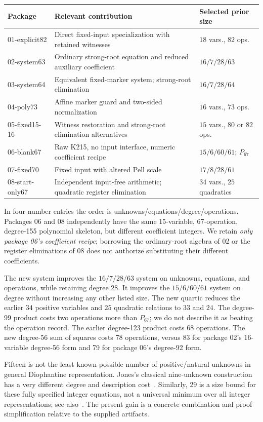 \documentclass[11pt,a4paper]{article}
\theoremstyle{remark}\newtheorem{remark}[theorem]{Remark}
\begin{document}
\begin{center}\small
\begin{tabular}{p{29mm}p{71mm}p{34mm}}
\toprule
Package & Relevant contribution & Selected prior size\\
\midrule
01-explicit82 & Direct fixed-input specialization with retained witnesses & $18$ vars., $82$ ops.\\
02-system63 & Ordinary strong-root equation and reduced auxiliary coefficient & $16/7/28/63$\\
03-system64 & Equivalent fixed-marker system; strong-root elimination & $16/7/28/64$\\
04-poly73 & Affine marker guard and two-sided normalization & $16$ vars., $73$ ops.\\
05-fixed15-16 & Witness restoration and strong-root elimination alternatives & $15$ vars., $80$ or $82$ ops.\\
06-blank67 & Raw K215, no input interface, numeric coefficient recipe & $15/6/60/61$; $P_{67}$\\
07-fixed70 & Fixed input with altered Pell scale & $17/8/28/61$\\
08-start-only67 & Independent input-free arithmetic; quadratic register elimination & $34$ vars., $25$ quadratics\\
\bottomrule
\end{tabular}
\end{center}
In four-number entries the order is unknowns/equations/degree/operations.
Packages 06 and 08 independently have the same 15-variable,
67-operation, degree-155 polynomial skeleton, but different coefficient
integers. We retain \emph{only package 06's coefficient recipe}; borrowing
the ordinary-root algebra of 02 or the register eliminations of 08 does
not authorize substituting their different coefficients.

The new system improves the $16/7/28/63$ system on unknowns, equations,
and operations, while retaining degree 28. It improves the $15/6/60/61$
system on degree without increasing any other listed size. The new
quartic reduces the earlier $34$ positive variables and $25$ quadratic
relations to $33$ and $24$. The degree-99 product costs two operations
more than $P_{67}$; we do not describe it as beating the operation record.
The earlier degree-123 product costs 68 operations. The new degree-56
sum of squares costs 78 operations, versus 83 for package 02's
16-variable degree-56 form and 79 for package 06's degree-92 form.

Fifteen is not the least known possible number of positive/natural
unknowns in general Diophantine representation. Jones's classical
nine-unknown construction has a very different degree and description
cost~\cite{jones}. Similarly, 29 is a size bound for these fully specified
integer equations, not a universal minimum over all integer
representations; see also~\cite{bayer}. The present gain is a concrete
combination and proof simplification relative to the supplied artifacts.
\end{document}
